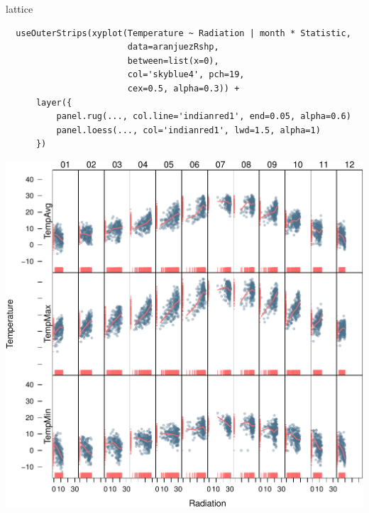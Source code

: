 \documentclass[xcolor={usenames,svgnames,dvipsnames}]{beamer}
\begin{document}
\begin{frame}[fragile,label=sec-5-2-3]{lattice}
 \lstset{language=R,label= ,caption= ,numbers=none}
\begin{lstlisting}
  useOuterStrips(xyplot(Temperature ~ Radiation | month * Statistic,
                        data=aranjuezRshp,
                        between=list(x=0),
                        col='skyblue4', pch=19,
                        cex=0.5, alpha=0.3)) +
      layer({
          panel.rug(..., col.line='indianred1', end=0.05, alpha=0.6)
          panel.loess(..., col='indianred1', lwd=1.5, alpha=1)
      })
\end{lstlisting}
\end{frame}


\begin{frame}[label=sec-5-2-4]{}
\includegraphics[width=.9\linewidth]{figs/aranjuezOuterStrips.pdf}
\end{frame}


\subsection{}
\label{sec-5-3}
\end{document}

